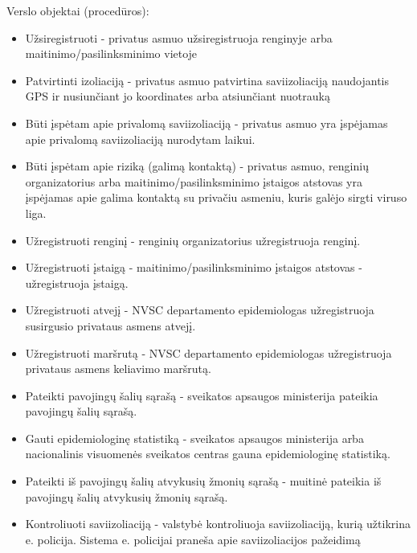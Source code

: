 \documentclass{VUMIFPSkursinis}
\begin{document}
\noindent Verslo objektai (procedūros):
\begin{itemize}
	\item Užsiregistruoti - privatus asmuo užsiregistruoja renginyje arba maitinimo/pasilinksminimo vietoje
	\item Patvirtinti izoliaciją - privatus asmuo patvirtina saviizoliaciją naudojantis GPS ir nusiunčiant jo koordinates arba atsiunčiant nuotrauką
	\item Būti įspėtam apie privalomą saviizoliaciją - privatus asmuo yra įspėjamas apie privalomą saviizoliaciją nurodytam laikui.
	\item Būti įspėtam apie riziką (galimą kontaktą) - privatus asmuo, renginių organizatorius arba maitinimo/pasilinksminimo įstaigos atstovas yra įspėjamas apie galima kontaktą su privačiu asmeniu, kuris galėjo sirgti viruso liga.
	\item Užregistruoti renginį - renginių organizatorius užregistruoja renginį.
	\item Užregistruoti įstaigą - maitinimo/pasilinksminimo įstaigos atstovas - užregistruoja įstaigą.
	\item Užregistruoti atvejį - NVSC departamento epidemiologas užregistruoja susirgusio privataus asmens atvejį.
	\item Užregistruoti maršrutą - NVSC departamento epidemiologas užregistruoja privataus asmens keliavimo maršrutą.
	\item Pateikti pavojingų šalių sąrašą - sveikatos apsaugos ministerija pateikia pavojingų šalių sąrašą.
	\item Gauti epidemiologinę statistiką - sveikatos apsaugos ministerija arba nacionalinis visuomenės sveikatos centras gauna epidemiologinę statistiką.
	\item Pateikti iš pavojingų šalių atvykusių žmonių sąrašą - muitinė pateikia iš pavojingų šalių atvykusių žmonių sąrašą.
	\item Kontroliuoti saviizoliaciją - valstybė kontroliuoja saviizoliaciją, kurią užtikrina e. policija. Sistema e. policijai praneša apie saviizoliacijos pažeidimą
\end{itemize}
\end{document}

